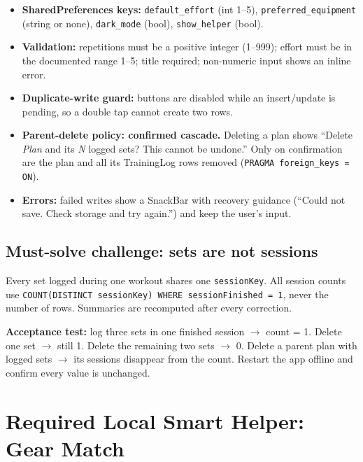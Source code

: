 \documentclass[11pt]{article}
\begin{document}
\medskip
\begin{itemize}
  \item \textbf{SharedPreferences keys:} \texttt{default\_effort} (int 1--5), \texttt{preferred\_equipment} (string or none), \texttt{dark\_mode} (bool), \texttt{show\_helper} (bool).
  \item \textbf{Validation:} repetitions must be a positive integer (1--999); effort must be in the documented range 1--5; title required; non-numeric input shows an inline error.
  \item \textbf{Duplicate-write guard:} buttons are disabled while an insert/update is pending, so a double tap cannot create two rows.
  \item \textbf{Parent-delete policy: confirmed cascade.} Deleting a plan shows ``Delete \emph{Plan} and its \emph{N} logged sets? This cannot be undone.'' Only on confirmation are the plan and all its TrainingLog rows removed (\texttt{PRAGMA foreign\_keys = ON}).
  \item \textbf{Errors:} failed writes show a SnackBar with recovery guidance (``Could not save. Check storage and try again.'') and keep the user's input.
\end{itemize}

\subsection*{Must-solve challenge: sets are not sessions}
Every set logged during one workout shares one \texttt{sessionKey}. All session counts use \texttt{COUNT(DISTINCT sessionKey) WHERE sessionFinished = 1}, never the number of rows. Summaries are recomputed after every correction.

\noindent\textbf{Acceptance test:} log three sets in one finished session $\rightarrow$ count = 1. Delete one set $\rightarrow$ still 1. Delete the remaining two sets $\rightarrow$ 0. Delete a parent plan with logged sets $\rightarrow$ its sessions disappear from the count. Restart the app offline and confirm every value is unchanged.

\section{Required Local Smart Helper: Gear Match}
\end{document}
